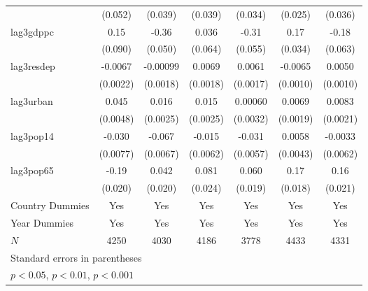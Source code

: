 \begin{table}[htbp]
\begin{tabular}{l*{6}{c}}
            &     (0.052)         &     (0.039)         &     (0.039)         &     (0.034)         &     (0.025)         &     (0.036)         \\
[1em]
lag3gdppc   &        0.15         &       -0.36\sym{***}&       0.036         &       -0.31\sym{***}&        0.17\sym{***}&       -0.18\sym{**} \\
            &     (0.090)         &     (0.050)         &     (0.064)         &     (0.055)         &     (0.034)         &     (0.063)         \\
[1em]
lag3resdep  &     -0.0067\sym{**} &    -0.00099         &      0.0069\sym{***}&      0.0061\sym{***}&     -0.0065\sym{***}&      0.0050\sym{***}\\
            &    (0.0022)         &    (0.0018)         &    (0.0018)         &    (0.0017)         &    (0.0010)         &    (0.0010)         \\
[1em]
lag3urban   &       0.045\sym{***}&       0.016\sym{***}&       0.015\sym{***}&     0.00060         &      0.0069\sym{***}&      0.0083\sym{***}\\
            &    (0.0048)         &    (0.0025)         &    (0.0025)         &    (0.0032)         &    (0.0019)         &    (0.0021)         \\
[1em]
lag3pop14   &      -0.030\sym{***}&      -0.067\sym{***}&      -0.015\sym{*}  &      -0.031\sym{***}&      0.0058         &     -0.0033         \\
            &    (0.0077)         &    (0.0067)         &    (0.0062)         &    (0.0057)         &    (0.0043)         &    (0.0062)         \\
[1em]
lag3pop65   &       -0.19\sym{***}&       0.042\sym{*}  &       0.081\sym{***}&       0.060\sym{**} &        0.17\sym{***}&        0.16\sym{***}\\
            &     (0.020)         &     (0.020)         &     (0.024)         &     (0.019)         &     (0.018)         &     (0.021)         \\
[1em]
Country Dummies &         Yes         &         Yes         &         Yes         &         Yes         &         Yes         &         Yes         \\
[1em]
Year Dummies &         Yes         &         Yes         &         Yes         &         Yes         &         Yes         &         Yes         \\
\hline
\(N\)       &        4250         &        4030         &        4186         &        3778         &        4433         &        4331         \\
\hline\hline
\multicolumn{7}{l}{\footnotesize Standard errors in parentheses}\\
\multicolumn{7}{l}{\footnotesize \sym{*} \(p<0.05\), \sym{**} \(p<0.01\), \sym{***} \(p<0.001\)}\\
\end{tabular}
\end{table}
